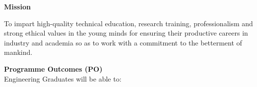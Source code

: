 \noindent\textbf{Mission}
\begin{tcolorbox}[colback=white, colframe=black, rounded corners, width=\textwidth]
	To impart high-quality technical education, research training, professionalism and strong ethical values in the young minds for ensuring their productive careers in industry and academia so as to work with a commitment to the betterment of mankind.

\end{tcolorbox}


\newpage
\noindent\textbf{Programme Outcomes (PO)} \\
Engineering Graduates will be able to:
